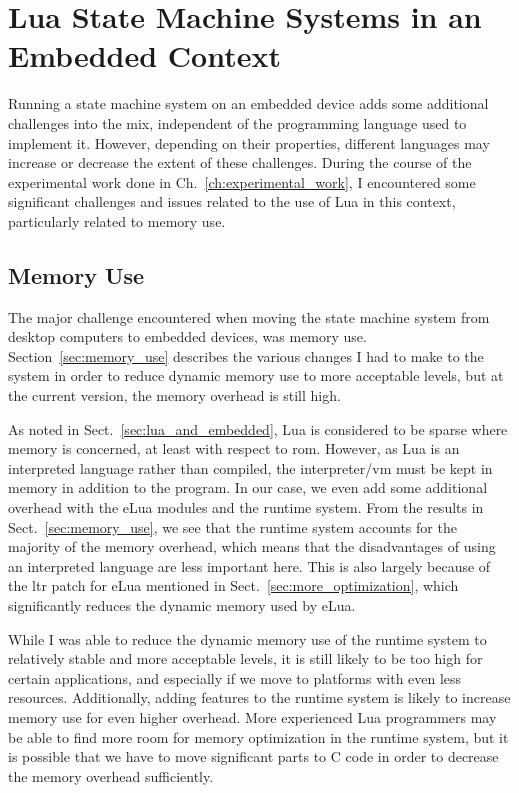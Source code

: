 \section{Lua State Machine Systems in an Embedded Context}
\label{sec:disq_lua_embedded}
Running a state machine system on an embedded device adds some additional challenges into the mix, independent of the programming language used to implement it. However, depending on their properties, different languages may increase or decrease the extent of these challenges. During the course of the experimental work done in Ch.~\ref{ch:experimental_work}, I encountered some significant challenges and issues related to the use of Lua in this context, particularly related to memory use.

\subsection{Memory Use}
\label{sec:disq_memory_use}
The major challenge encountered when moving the state machine system from desktop computers to embedded devices, was memory use. Section~\ref{sec:memory_use} describes the various changes I had to make to the system in order to reduce dynamic memory use to more acceptable levels, but at the current version, the memory overhead is still high.

As noted in Sect.~\ref{sec:lua_and_embedded}, Lua is considered to be sparse where memory is concerned, at least with respect to \gls{rom}. However, as Lua is an interpreted language rather than compiled, the interpreter/\gls{vm} must be kept in memory in addition to the program. In our case, we even add some additional overhead with the eLua modules and the runtime system. From the results in Sect.~\ref{sec:memory_use}, we see that the runtime system accounts for the majority of the memory overhead, which means that the disadvantages of using an interpreted language are less important here. This is also largely because of the \gls{ltr} patch for eLua mentioned in Sect.~\ref{sec:more_optimization}, which significantly reduces the dynamic memory used by eLua.

While I was able to reduce the dynamic memory use of the runtime system to relatively stable and more acceptable levels, it is still likely to be too high for certain applications, and especially if we move to platforms with even less resources. Additionally, adding features to the runtime system is likely to increase memory use for even higher overhead. More experienced Lua programmers may be able to find more room for memory optimization in the runtime system, but it is possible that we have to move significant parts to C code in order to decrease the memory overhead sufficiently.

